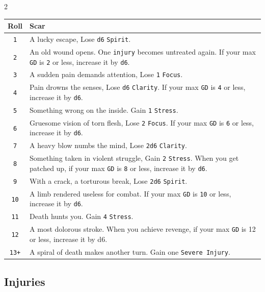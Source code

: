 \begin{multicols*}{2}
\begin{center}
  \label{scars}
    \begin{tabular}{|c|p{6.4cm}|}
        \hline
        \textbf{Roll} & \textbf{Scar} \\
        \hline
        \texttt{1} & A lucky escape, Lose \texttt{d6} \texttt{Spirit}.\\
        \texttt{2} & An old wound opens. One \texttt{injury} becomes untreated again. If your max \texttt{GD} is \texttt{2} or less, increase it by \texttt{d6}. \\
        \texttt{3} & A sudden pain demands attention, Lose \texttt{1} \texttt{Focus}.\\
        \texttt{4} & Pain drowns the senses, Lose \texttt{d6} \texttt{Clarity}. If your max \texttt{GD} is \texttt{4} or less, increase it by \texttt{d6}.\\
        \texttt{5} & Something wrong on the inside. Gain \texttt{1} \texttt{Stress}.\\
        \texttt{6} & Gruesome vision of torn flesh, Lose \texttt{2} \texttt{Focus}. If your max \texttt{GD} is \texttt{6} or less, increase it by \texttt{d6}.\\
        \texttt{7} & A heavy blow numbs the mind, Lose \texttt{2d6} \texttt{Clarity}.\\
        \texttt{8} & Something taken in violent struggle, Gain \texttt{2} \texttt{Stress}. When you get patched up, if your max \texttt{GD} is \texttt{8} or less, increase it by \texttt{d6}.\\
        \texttt{9} & With a crack, a torturous break, Lose \texttt{2d6} \texttt{Spirit}.\\
        \texttt{10} & A limb rendered useless for combat. If your max \texttt{GD} is \texttt{10} or less, increase it by \texttt{d6}. \\
        \texttt{11} & Death hunts you. Gain \texttt{4} \texttt{Stress}. \\
        \texttt{12} & A most dolorous stroke. When you achieve revenge, if your max \texttt{GD} is 12 or less, increase it by d6.\\
        \texttt{13+} & A spiral of death makes another turn. Gain one \texttt{Severe Injury}.\\
        \hline
    \end{tabular}
\end{center}

\newcolumn{}

\subsection*{Injuries}
\label{sec:injuries}


\end{multicols*}
